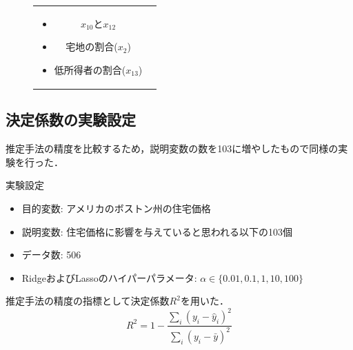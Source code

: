 \documentclass[dvipdfmx, 10pt]{beamer}
\begin{document}
\begin{frame}{\insertsubsection}
\begin{figure}[H]
\begin{tabular}{cc}
\begin{minipage}{0.5\hsize}
\begin{itemize}
\begin{itemize}
                                      \begin{itemize}
                                            \item $x_{10}$と$x_{12}$
                                            \item 宅地の割合($x_2$)
                                            \item 低所得者の割合($x_{13}$)
                                       \end{itemize}
                                   \end{itemize}
                            \end{itemize}
            	\end{minipage}
    	     \end{tabular}
    \end{figure}
    \end{frame}

\subsection{決定係数の実験設定}
\begin{frame}{\insertsubsection}
    推定手法の精度を比較するため，説明変数の数を103に増やしたもので同様の実験を行った．\\
    \begin{block}{実験設定}
        \begin{itemize}
                \item 目的変数: アメリカのボストン州の住宅価格
                \item 説明変数: 住宅価格に影響を与えていると思われる以下の103個
                \item データ数: 506
                \item RidgeおよびLassoのハイパーパラメータ: $\alpha \in \{0.01, 0.1, 1, 10, 100\}$
        \end{itemize}
    \end{block}
    推定手法の精度の指標として決定係数$R^2$を用いた．
    \begin{equation}
    	R^2 = 1 - \frac{\sum_{i}^{}(y_i - \hat{y}_i)^2}{\sum_{i}^{}(y_i - \bar{y})^2}
    \end{equation}
\end{frame}
\end{document}
